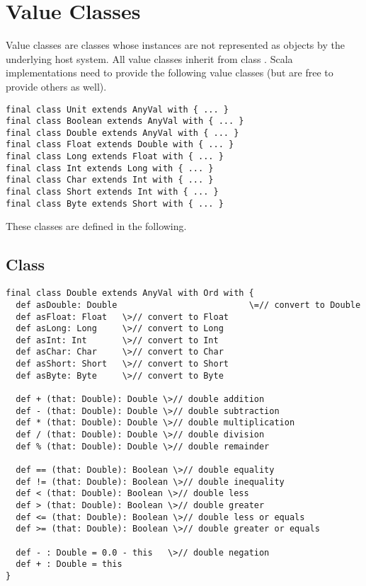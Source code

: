 \documentclass[11pt]{report}
\begin{document}
\section{Value Classes}
\label{sec:cls-value}

Value classes are classes whose instances are not represented as
objects by the underlying host system.  All value classes inherit from
class \verb@AnyVal@. Scala implementations need to provide the
following value classes (but are free to provide others as well).

\begin{verbatim}
final class Unit extends AnyVal with { ... }
final class Boolean extends AnyVal with { ... }
final class Double extends AnyVal with { ... }
final class Float extends Double with { ... }
final class Long extends Float with { ... }
final class Int extends Long with { ... }
final class Char extends Int with { ... }
final class Short extends Int with { ... }
final class Byte extends Short with { ... }
\end{verbatim}

These classes are defined in the following.

\subsection{Class }

\begin{verbatim}
final class Double extends AnyVal with Ord with {
  def asDouble: Double                          \=// convert to Double
  def asFloat: Float   \>// convert to Float
  def asLong: Long     \>// convert to Long
  def asInt: Int       \>// convert to Int
  def asChar: Char     \>// convert to Char
  def asShort: Short   \>// convert to Short
  def asByte: Byte     \>// convert to Byte

  def + (that: Double): Double \>// double addition
  def - (that: Double): Double \>// double subtraction
  def * (that: Double): Double \>// double multiplication
  def / (that: Double): Double \>// double division
  def % (that: Double): Double \>// double remainder

  def == (that: Double): Boolean \>// double equality
  def != (that: Double): Boolean \>// double inequality
  def < (that: Double): Boolean \>// double less
  def > (that: Double): Boolean \>// double greater
  def <= (that: Double): Boolean \>// double less or equals
  def >= (that: Double): Boolean \>// double greater or equals

  def - : Double = 0.0 - this   \>// double negation
  def + : Double = this
}
\end{verbatim}
\end{document}
